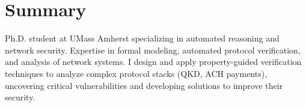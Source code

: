 \section{Summary}
\noindent
Ph.D. student at UMass Amherst specializing in automated reasoning and network security. Expertise in formal modeling, automated protocol verification, and analysis of network systems. I design and apply property-guided verification techniques to analyze complex protocol stacks (QKD, ACH payments), uncovering critical vulnerabilities and developing solutions to improve their security.

